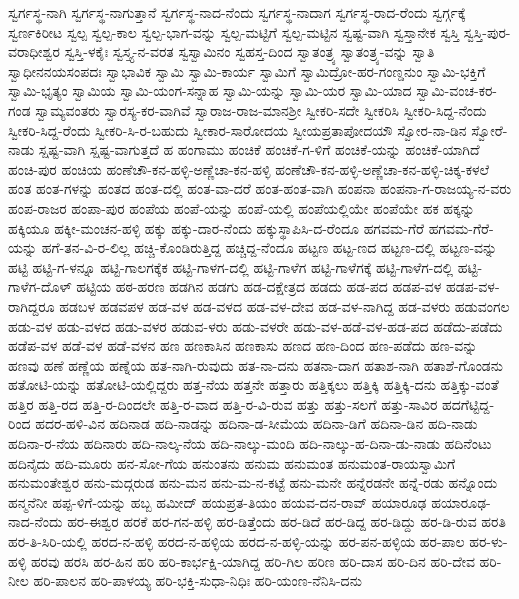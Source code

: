 {ಸ್ವರ್ಗಸ್ಥ-ನಾಗಿ
ಸ್ವರ್ಗಸ್ಥ-ನಾಗುತ್ತಾನೆ
ಸ್ವರ್ಗಸ್ಥ-ನಾದ-ನೆಂದು
ಸ್ವರ್ಗಸ್ಥ-ನಾದಾಗ
ಸ್ವರ್ಗಸ್ಥ-ರಾದ-ರೆಂದು
ಸ್ವರ್ಗ್ಗಕ್ಕೆ
ಸ್ವರ್ಣಕಿರೀಟ
ಸ್ವಲ್ಪ
ಸ್ವಲ್ಪ-ಕಾಲ
ಸ್ವಲ್ಪ-ಭಾಗ-ವನ್ನು
ಸ್ವಲ್ಪ-ಮಟ್ಟಿಗೆ
ಸ್ವಲ್ಪ-ಮಟ್ಟಿನ
ಸ್ವಷ್ಟ-ವಾಗಿ
ಸ್ವಸ್ತಾನೇಕ
ಸ್ವಸ್ತಿ
ಸ್ವಸ್ತಿ-ಪುರ-ವರಾಧೀಶ್ವರ
ಸ್ವಸ್ತಿ-ಳಕೈಃ
ಸ್ವಸ್ತ್ಯ-ನ-ವರತ
ಸ್ವಸ್ವಾಮಿನಂ
ಸ್ವಹಸ್ತ-ದಿಂದ
ಸ್ವಾತಂತ್ರ್ಯ
ಸ್ವಾತಂತ್ರ್ಯ-ವನ್ನು
ಸ್ವಾತಿ
ಸ್ವಾಧೀನನಯಸಂಪದಃ
ಸ್ವಾಭಾವಿಕ
ಸ್ವಾಮಿ
ಸ್ವಾಮಿ-ಕಾರ್ಯ
ಸ್ವಾಮಿಗೆ
ಸ್ವಾಮಿದ್ರೋ-ಹರ-ಗಂಣ್ಡನುಂ
ಸ್ವಾಮಿ-ಭಕ್ತಿಗೆ
ಸ್ವಾಮಿ-ಭೃತ್ಯಂ
ಸ್ವಾಮಿಯ
ಸ್ವಾಮಿ-ಯಂಗ-ಸನ್ನಾಹ
ಸ್ವಾಮಿ-ಯನ್ನು
ಸ್ವಾಮಿ-ಯರ
ಸ್ವಾಮಿ-ಯಾದ
ಸ್ವಾಮಿ-ವಂಚ-ಕರ-ಗಂಡ
ಸ್ವಾಮ್ಯವಂತರು
ಸ್ವಾರಸ್ಯ-ಕರ-ವಾಗಿವೆ
ಸ್ವಾರಾಜ-ರಾಜ-ಮಾನಶ್ರೀ
ಸ್ವೀಕರಿ-ಸದೇ
ಸ್ವೀಕರಿಸಿ
ಸ್ವೀಕರಿ-ಸಿದ್ದ-ನೆಂದು
ಸ್ವೀಕರಿ-ಸಿದ್ದ-ರೆಂದು
ಸ್ವೀಕರಿ-ಸಿ-ರ-ಬಹುದು
ಸ್ವೀಕಾರ-ಸಾರೋದಯ
ಸ್ವೀಯಪ್ರತಾಪೋದಯೌ
ಸ್ವೋರ-ನಾ-ಡಿನ
ಸ್ವೋರೆ-ನಾಡು
ಸ್ಷಷ್ಟ-ವಾಗಿ
ಸ್ಷಷ್ಟ-ವಾಗುತ್ತದೆ
ಹ
ಹಂಗಾಮು
ಹಂಚಿಕೆ
ಹಂಚಿಕೆ-ಗ-ಳಿಗೆ
ಹಂಚಿಕೆ-ಯನ್ನು
ಹಂಚಿಕೆ-ಯಾಗಿದೆ
ಹಂಚಿ-ಪುರ
ಹಂಚಿಯ
ಹಂಣೆಚೌ-ಕನ-ಹಳ್ಳಿ-ಅಣ್ಣೆಚಾ-ಕನ-ಹಳ್ಳಿ
ಹಂಣೆಚೌ-ಕನ-ಹಳ್ಳಿ-ಅಣ್ಣೆಚಾ-ಕನ-ಹಳ್ಳಿ-ಚಿಕ್ಕ-ಕಳಲೆ
ಹಂತ
ಹಂತ-ಗಳನ್ನು
ಹಂತದ
ಹಂತ-ದಲ್ಲಿ
ಹಂತ-ವಾ-ದರೆ
ಹಂತ-ಹಂತ-ವಾಗಿ
ಹಂಪನಾ
ಹಂಪನಾ-ಗ-ರಾಜಯ್ಯ-ನ-ವರು
ಹಂಪ-ರಾಜರ
ಹಂಪಾ-ಪುರ
ಹಂಪೆಯ
ಹಂಪೆ-ಯನ್ನು
ಹಂಪೆ-ಯಲ್ಲಿ
ಹಂಪೆಯಲ್ಲಿಯೇ
ಹಂಪೆಯೇ
ಹಕ
ಹಕ್ಕನ್ನು
ಹಕ್ಕಿಯೂ
ಹಕ್ಕೀ-ಮಂಚನ-ಹಳ್ಳಿ
ಹಕ್ಕು
ಹಕ್ಕು-ದಾರ-ನೆಂದು
ಹಕ್ಕುಸ್ಥಾಪಿಸಿ-ದ-ರೆಂದೂ
ಹಗವಮ-ಗೆರೆ
ಹಗವಮ-ಗೆರೆ-ಯನ್ನು
ಹಗೆ-ತನ-ವಿ-ರ-ಲಿಲ್ಲ
ಹಚ್ಚಿ-ಕೊಂಡಿರುತ್ತಿದ್ದ
ಹಚ್ಚಿದ್ದ-ನೆಂದೂ
ಹಟ್ಟಣ
ಹಟ್ಟ-ಣದ
ಹಟ್ಟಣ-ದಲ್ಲಿ
ಹಟ್ಟಣ-ವನ್ನು
ಹಟ್ಟಿ
ಹಟ್ಟಿ-ಗ-ಳನ್ನೂ
ಹಟ್ಟಿ-ಗಾಲಗಕ್ಕೆಕ
ಹಟ್ಟಿ-ಗಾಳಗ-ದಲ್ಲಿ
ಹಟ್ಟಿ-ಗಾಳೆಗ
ಹಟ್ಟಿ-ಗಾಳೆಗಕ್ಕೆ
ಹಟ್ಟಿ-ಗಾಳೆಗ-ದಲ್ಲಿ
ಹಟ್ಟಿ-ಗಾಳೆಗ-ದೊಳ್
ಹಟ್ಟಿಯ
ಹಠ-ಹರಣ
ಹಡಗಿನ
ಹಡಗು
ಹಡ-ದಕ್ಷೇತ್ರದ
ಹಡದು
ಹಡ-ಪದ
ಹಡಪ-ವಳ
ಹಡಪ-ವಳ-ರಾಗಿದ್ದರೂ
ಹಡಬಳ
ಹಡವಪಳ
ಹಡ-ವಳ
ಹಡ-ವಳದ
ಹಡ-ವಳ-ದೇವ
ಹಡ-ವಳ-ನಾಗಿದ್ದ
ಹಡ-ವಳರು
ಹಡುವಂಗಲ
ಹಡು-ವಳ
ಹಡು-ವಳದ
ಹಡು-ವಳರ
ಹಡುವ-ಳರು
ಹಡು-ವಳರೇ
ಹಡು-ವಳ-ಹಡೆ-ವಳ-ಹಡ-ಪದ
ಹಡೆದು-ಪಡೆದು
ಹಡೆಪ-ವಳ
ಹಡೆ-ವಳ
ಹಡೆ-ವಳನ
ಹಣ
ಹಣಕಾಸಿನ
ಹಣಕಾಸು
ಹಣದ
ಹಣ-ದಿಂದ
ಹಣ-ಪಡೆದು
ಹಣ-ವನ್ನು
ಹಣವು
ಹಣೆ
ಹಣ್ಣೆಯ
ಹಣ್ನೆಯ
ಹತ-ನಾಗಿ-ರುವುದು
ಹತ-ನಾ-ದನು
ಹತನಾ-ದಾಗ
ಹತಾಶ-ನಾಗಿ
ಹತಾಶೆ-ಗೊಂಡನು
ಹತೋಟಿ-ಯನ್ನು
ಹತೋಟಿ-ಯಲ್ಲಿದ್ದರು
ಹತ್ತ-ನೆಯ
ಹತ್ತನೇ
ಹತ್ತಾರು
ಹತ್ತಿಕ್ಕಲು
ಹತ್ತಿಕ್ಕಿ
ಹತ್ತಿಕ್ಕಿ-ದನು
ಹತ್ತಿಕ್ಕು-ವಂತೆ
ಹತ್ತಿರ
ಹತ್ತಿ-ರದ
ಹತ್ತಿ-ರ-ದಿಂದಲೇ
ಹತ್ತಿ-ರ-ವಾದ
ಹತ್ತಿ-ರ-ವಿ-ರುವ
ಹತ್ತು
ಹತ್ತು-ಸಲಗೆ
ಹತ್ತು-ಸಾವಿರ
ಹದಗೆಟ್ಟಿದ್ದ-ರಿಂದ
ಹದರ-ಹಳಿ-ವಿನ
ಹದಿನಾಡ
ಹದಿ-ನಾಡನ್ನು
ಹದಿನಾ-ಡ-ಸೀಮೆಯ
ಹದಿನಾ-ಡಿಗೆ
ಹದಿನಾ-ಡಿನ
ಹದಿ-ನಾಡು
ಹದಿನಾ-ರ-ನೆಯ
ಹದಿನಾರು
ಹದಿ-ನಾಲ್ಕ-ನೆಯ
ಹದಿ-ನಾಲ್ಕು-ಮಂದಿ
ಹದಿ-ನಾಲ್ಕು-ಹ-ದಿನಾ-ಡು-ನಾಡು
ಹದಿನೆಂಟು
ಹದಿನೈದು
ಹದಿ-ಮೂರು
ಹನ-ಸೋ-ಗೆಯ
ಹನುಂತನು
ಹನುಮ
ಹನುಮಂತ
ಹನುಮಂತ-ರಾಯಸ್ವಾಮಿಗೆ
ಹನುಮಂತೇಶ್ವರ
ಹನು-ಮದ್ಗರುಡ
ಹನು-ಮನ
ಹನು-ಮ-ನ-ಕಟ್ಟೆ
ಹನು-ಮನೇ
ಹನ್ನೆರಡನೇ
ಹನ್ನೆ-ರಡು
ಹನ್ನೊಂದು
ಹನ್ಮನೆನೀ
ಹಪ್ಪ-ಳಿಗೆ-ಯನ್ನು
ಹಬ್ಬ
ಹಮೀದ್
ಹಯಪ್ರತ-ತಿಯಂ
ಹಯವ-ದನ-ರಾವ್
ಹಯಾರೂಢ
ಹಯಾರೂಢ-ನಾದ-ನೆಂದು
ಹರ-ಈಶ್ವರ
ಹರಕೆ
ಹರ-ಗನ-ಹಳ್ಳಿ
ಹರ-ಡಿತ್ತೆಂದು
ಹರ-ಡಿದೆ
ಹರ-ಡಿದ್ದ
ಹರ-ಡಿದ್ದು
ಹರ-ಡಿ-ರುವ
ಹರತಿ
ಹರ-ತಿ-ಸಿರಿ-ಯಲ್ಲಿ
ಹರದ-ನ-ಹಳ್ಳಿ
ಹರದ-ನ-ಹಳ್ಳಿಯ
ಹರದ-ನ-ಹಳ್ಳಿ-ಯನ್ನು
ಹರ-ಪನ-ಹಳ್ಳಿಯ
ಹರ-ಪಾಲ
ಹರ-ಳು-ಹಳ್ಳಿ
ಹರವು
ಹರಸಿ
ಹರ-ಹಿನ
ಹರಿ
ಹರಿ-ಕಾರ್ಭಕ್ಷಿ-ಯಾಗಿದ್ದ
ಹರಿ-ಗಿಲ
ಹರಿಣ
ಹರಿ-ದಾಸ
ಹರಿ-ದಿನ
ಹರಿ-ದೇವ
ಹರಿ-ನೀಲ
ಹರಿ-ಪಾಲನ
ಹರಿ-ಪಾಳಯ್ಯ
ಹರಿ-ಭಕ್ತಿ-ಸುಧಾ-ನಿಧಿಃ
ಹರಿ-ಯಂಣ-ನೆನಿಸಿ-ದನು
}

